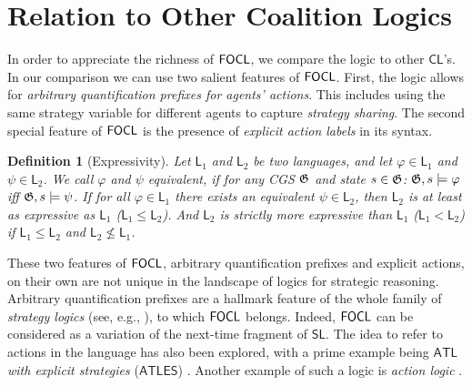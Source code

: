 \documentclass{article}
\newtheorem{example}{Example}
\newtheorem{definition}{Definition}
\begin{document}

   \section{Relation to Other Coalition Logics}
\label{sec:expressivity}
In order to appreciate the richness of $\mathsf{FOCL}$, we compare the logic to other $\mathsf{CL}$'s. In our comparison we can use two salient features of $\mathsf{FOCL}$. First, the logic allows for \textit{arbitrary quantification prefixes for agents' actions}. This includes using the same strategy variable for different agents to capture \textit{strategy sharing}. The second special feature of $\mathsf{FOCL}$ is the presence of \textit{explicit action labels} in its syntax.

\begin{definition}[Expressivity]
    Let $\mathsf{L}_1$ and $\mathsf{L}_2$ be two languages, and let $\varphi \in \mathsf{L}_1$ and $\psi \in \mathsf{L}_2$. We call $\varphi$ and $\psi$ \emph{equivalent}, if for any CGS $\mathfrak{G}$ and state $s \in \mathfrak{G}$: 
    $\mathfrak{G},s \models \varphi$ iff $\mathfrak{G}, s \models \psi$.  If for all $\varphi \in \mathsf{L}_1$ there exists an equivalent $\psi \in \mathsf{L}_2$, then $\mathsf{L}_2$ is \emph{at least as expressive as } $\mathsf{L}_1$ ($\mathsf{L}_1 \leqslant \mathsf{L}_2$). And $\mathsf{L}_2$ is \emph{strictly more expressive than } $\mathsf{L}_1$ ($\mathsf{L}_1 < \mathsf{L}_2$) if $\mathsf{L}_1 \leqslant \mathsf{L}_2$ and $\mathsf{L}_2 \not \leqslant \mathsf{L}_1$.
\end{definition}

These two features of $\mathsf{FOCL}$, arbitrary quantification prefixes and explicit actions, on their own are not unique in the landscape of logics for strategic reasoning. %
Arbitrary quantification prefixes are a hallmark feature of the whole family of \textit{strategy logics} (see, e.g., \cite{mogavero10,belardinelli19}), to which $\mathsf{FOCL}$ belongs. Indeed, $\mathsf{FOCL}$ can be considered as a variation of the next-time fragment of $\mathsf{SL}$. %
The idea to refer to actions in the language has also been explored, with %
a prime example being $\mathsf{ATL}$ \textit{with explicit strategies} ($\mathsf{ATLES}$) \cite{walther07}. Another example of such a logic %
is \textit{action logic} %
\cite{borgo07}.%
\end{document}

